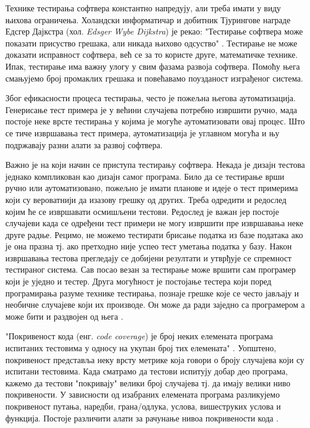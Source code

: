 \documentclass[12pt,oneside]{memoir}
\begin{document}
Технике тестирања софтвера константно напредују, али треба имати у виду њихова ограничења. Холандски информатичар и добитник Тјурингове награде Едсгер Дајкстра (хол. \textit{Edsger Wybe Dijkstra}) је рекао: "Тестирање софтвера може показати присуство грешака, али никада њихово одсуство" \cite{testPrinc}. Тестирање не може доказати исправност софтвера, већ се за то користе друге, математичке технике. Ипак, тестирање има важну улогу у свим фазама развоја софтвера. Помоћу њега смањујемо број промаклих грешака и повећавамо поузданост изграђеног система.

Због ефикасности процеса тестирања, често је пожељна његова аутоматизација. Генерисање тест примера је у већини случајева потребно извршити ручно, мада постоје неке врсте тестирања у којима је могуће аутоматизовати овај процес. Што се тиче извршавања тест примера, аутоматизација је углавном могућа и њу подржавају разни алати за развој софтвера.

Важно је на који начин се приступа тестирању софтвера. Некада је дизајн тестова једнако компликован као дизајн самог програма. Било да се тестирање врши ручно или аутоматизовано, пожељно је имати планове и идеје о тест примерима који су вероватнији да изазову грешку од других. Треба одредити и редослед којим ће се извршавати осмишљени тестови. Редослед је важан јер постоје случајеви када се одређени тест примери не могу извршити пре извршавања неке друге радње. Рецимо, не можемо тестирати брисање податка из базе података ако је она празна тј. ако претходно није успео тест уметања податка у базу. Након извршавања тестова прегледају се добијени резултати и утврђује се спремност тестираног система. Сав посао везан за тестирање може вршити сам програмер који је уједно и тестер. Друга могућност је постојање тестера који поред програмирања разуме технике тестирања, познаје грешке које се често јављају и необичне случајеве који их производе. Он може да ради заједно са програмером а може бити и раздвојен од њега \cite{guideTestDesign, testMilena}.

"Покривеност кода (енг. \textit{code coverage}) је број неких елемената програма испитаних тестовима у односу на укупан број тих елемената" \cite{testMilena}. Уопштено, покривеност представља неку врсту метрике која говори о броју случајева који су испитани тестовима. Када сматрамо да тестови испитују добар део програма, кажемо да тестови "покривају" велики број случајева тј. да имају велики ниво покривености. У зависности од изабраних елемената програма разликујемо покривеност путања, наредби, грана/одлука, услова, вишеструких услова и функција. Постоје различити алати за рачунање нивоа покривености кода \cite{testMilena}.
\end{document}

